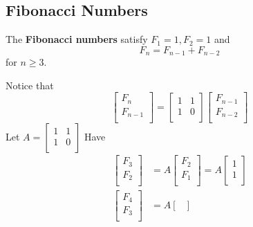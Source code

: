 \documentclass{article}
\begin{document}
    \subsection{Fibonacci Numbers}
    \begin{definition}
      The \textbf{Fibonacci numbers} satisfy $F_1 = 1, F_2 = 1$ and \[
        F_n = F_{n-1} + F_{n-2}
      \] for $n \geq 3$.
    \end{definition}
    \begin{example}
      Notice that \[
        \begin{bmatrix}
          F_n\\
          F_{n-1}\\
        \end{bmatrix} =
        \begin{bmatrix}
          1 & 1 \\
          1 & 0\\
        \end{bmatrix}
        \begin{bmatrix}
          F_{n-1}\\
          F_{n-2}\\
        \end{bmatrix}
      \]
      Let $A =
      \begin{bmatrix}
        1 & 1\\
        1 & 0\\
      \end{bmatrix}$
      Have
      \begin{align*}
        \begin{bmatrix}
          F_3\\
          F_2\\
        \end{bmatrix} &= A
        \begin{bmatrix}
          F_2\\
          F_1\\
        \end{bmatrix} = A
        \begin{bmatrix}
          1\\1\\
        \end{bmatrix}\\
        \begin{bmatrix}
          F_4\\
          F_3\\
        \end{bmatrix} &= A
        \begin{bmatrix}

\end{bmatrix}
\end{align*}
\end{example}
\end{document}
